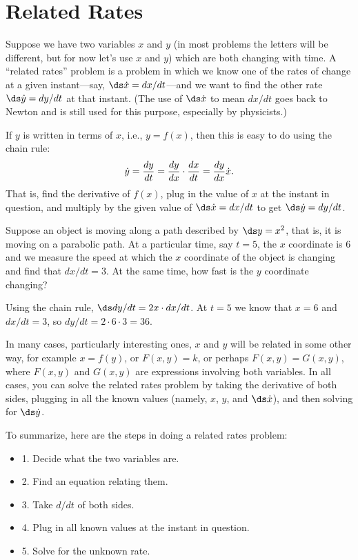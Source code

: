 \section{Related Rates}{}{}
\label{sec:related rates}
\nobreak
Suppose we have two variables $x$ and $y$ (in most problems the
letters will be different, but for now let's use $x$ and $y$) which
are both changing with time.  A ``related rates'' problem is a problem
in which we know one of the rates of change at a given instant---say,
$\ds \dot x = dx/dt$---and we want to find the other rate $\ds \dot y = dy/dt$ at that
instant. (The use of $\ds \dot x$ 
to mean $dx/dt$ goes back to Newton and
is still used for this purpose, especially by physicists.)

If $y$ is written in terms of $x$, i.e., $y=f(x)$, then this is easy
to do using the chain rule:
$$
\dot y = {dy\over dt}={dy\over dx}\cdot{dx\over dt}={dy\over dx}\dot x.
$$
That is, find the derivative of $f(x)$, plug in the value of
$x$ at the instant in question, and multiply by the given value of
$\ds \dot{x}=dx/dt$ to get $\ds \dot{y}=dy/dt$.

\begin{example}
Suppose an object is moving along a path described by $\ds y=x^2$, that
is, it is moving on a parabolic path. At a particular time, say $t=5$,
the $x$ coordinate is 6 and 
we measure the speed at which the $x$ coordinate of the object is
changing and find that $dx/dt = 3$. At the same time, how fast is the
$y$ coordinate changing?

Using the chain rule, $\ds dy/dt = 2x\cdot dx/dt$. At $t=5$ we know that
$x=6$ and $dx/dt=3$, so $dy/dt = 2\cdot 6\cdot 3 = 36$.
\end{example}

In many cases, particularly interesting ones,
$x$ and $y$ will be related in some other way, for example
$x=f(y)$, or $F(x,y)=k$, or perhaps $F(x,y)=G(x,y)$, where $F(x,y)$
and $G(x,y)$ are expressions involving both variables.  In all cases, you
can solve the related rates problem by taking the derivative of both sides,
plugging in all the known values (namely, $x$, $y$, and $\ds \dot{x}$), and
then solving for $\ds \dot{y}$.

To summarize, here are the steps in doing a related rates problem:

\begin{itemize} %

\item{1.} Decide what the two variables are.
\item{2.}  Find an equation relating them.
\item{3.}  Take $d/dt$ of both sides.
\item{4.}  Plug in all known values at the instant in question.
\item{5.}  Solve for the unknown rate.

\end{itemize}

